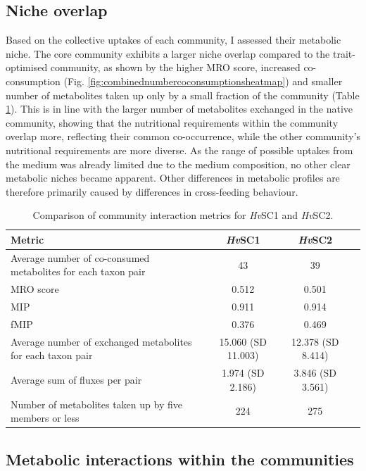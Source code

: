 \subsection{Niche overlap}
Based on the collective uptakes of each community, I assessed their metabolic niche. The core community exhibits a larger niche overlap compared to the trait-optimised community, as shown by the higher MRO score, increased co-consumption (Fig. \ref{fig:combinednumbercoconsumptionsheatmap}) and smaller number of metabolites taken up only by a small fraction of the community (Table \ref{tab:metabolic_profiles}). This is in line with the larger number of metabolites exchanged in the native community, showing that the nutritional requirements within the community overlap more, reflecting their common co-occurrence, while the other community's nutritional requirements are more diverse.
As the range of possible uptakes from the medium was already limited due to the medium composition, no other clear metabolic niches became apparent. Other differences in metabolic profiles are therefore primarily caused by differences in cross-feeding behaviour.

\begin{table}[H]
  \centering
  \caption{Comparison of community interaction metrics for \textit{Hv}SC1 and \textit{Hv}SC2.}
  \label{tab:metabolic_profiles}
  \begin{tabularx}{\linewidth}{Xccc}
    \hline
    \textbf{Metric} & \textbf{\textit{Hv}SC1} & \textbf{\textit{Hv}SC2} \\ \hline
    Average number of co-consumed metabolites for each taxon pair & 43 & 39 \\
    MRO score & 0.512 & 0.501 \\
    MIP & 0.911 & 0.914 \\
    fMIP & 0.376 & 0.469 \\
    Average number of exchanged metabolites for each taxon pair & 15.060 (SD 11.003) & 12.378 (SD 8.414) \\
    Average sum of fluxes per pair & 1.974 (SD 2.186) & 3.846 (SD 3.561) \\
    Number of metabolites taken up by five members or less & 224 & 275 \\ \hline
  \end{tabularx}
\end{table}

\subsection{Metabolic interactions within the communities}
